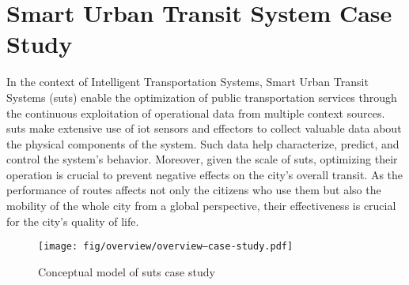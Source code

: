 \section{Smart Urban Transit System Case Study}
\label{sect:overview--suts-case-tudy}

In the context of Intelligent Transportation Systems, Smart Urban Transit Systems (\gls{suts}) enable the optimization of public transportation services through the continuous exploitation of operational data from multiple context sources. \gls{suts} make extensive use of \gls{iot} sensors and effectors to collect valuable data about the physical components of the system. Such data help characterize, predict, and control the system's behavior. Moreover, given the scale of \gls{suts}, optimizing their operation is crucial to prevent negative effects on the city's overall transit. As the performance of routes affects not only the citizens who use them but also the mobility of the whole city from a global perspective, their effectiveness is crucial for the city's quality of life.

\begin{figure}[h]
	\centering
	\texttt{[image: fig/overview/overview--case-study.pdf]}
	\caption{Conceptual model of \gls{suts} case study}
	\label{fig:overview--suts-case-study}
\end{figure}

